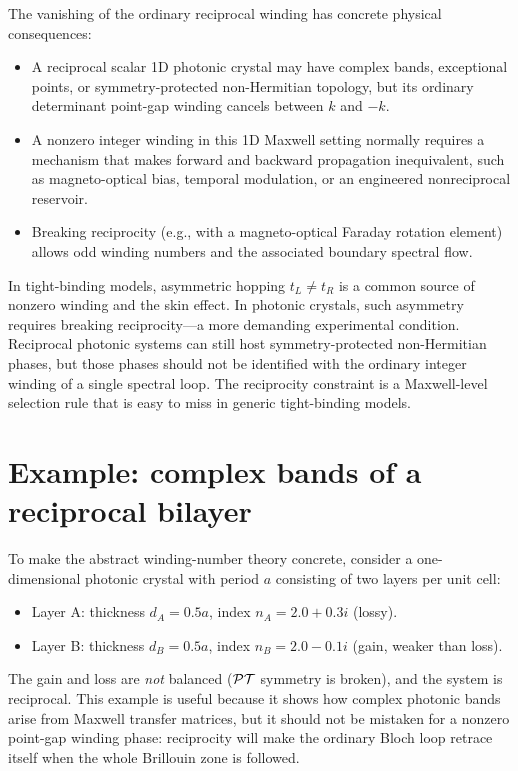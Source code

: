The vanishing of the ordinary reciprocal winding has concrete physical
consequences:
\begin{itemize}
 \item A reciprocal scalar 1D photonic crystal may have complex bands,
 exceptional points, or symmetry-protected non-Hermitian topology, but
 its ordinary determinant point-gap winding cancels between $k$ and
 $-k$.
 \item A nonzero integer winding in this 1D Maxwell setting normally
 requires a mechanism that makes forward and backward propagation
 inequivalent, such as magneto-optical bias, temporal modulation, or an
 engineered nonreciprocal reservoir.
 \item Breaking reciprocity (e.g., with a magneto-optical Faraday
 rotation element) allows odd winding numbers and the associated
 boundary spectral flow.
\end{itemize}

\begin{booknote}
In tight-binding models, asymmetric hopping $t_L \neq t_R$ is a common
source of nonzero winding and the skin effect. In photonic crystals,
such asymmetry requires breaking reciprocity---a more demanding
experimental condition. Reciprocal photonic systems can still host
symmetry-protected non-Hermitian phases, but those phases should not be
identified with the ordinary integer winding of a single spectral loop.
The reciprocity constraint is a Maxwell-level selection rule that is
easy to miss in generic tight-binding models.
\end{booknote}


\section{Example: complex bands of a reciprocal bilayer}
\label{sec:nh-bilayer}

To make the abstract winding-number theory concrete, consider a
one-dimensional photonic crystal with period $a$ consisting of two
layers per unit cell:
\begin{itemize}
 \item Layer A: thickness $d_A = 0.5a$, index $n_A = 2.0 + 0.3i$
 (lossy).
 \item Layer B: thickness $d_B = 0.5a$, index $n_B = 2.0 - 0.1i$
 (gain, weaker than loss).
\end{itemize}
The gain and loss are \emph{not} balanced ($\mathcal{PT}$ symmetry is broken),
and the system is reciprocal. This example is useful because it shows
how complex photonic bands arise from Maxwell transfer matrices, but it
should not be mistaken for a nonzero point-gap winding phase: reciprocity
will make the ordinary Bloch loop retrace itself when the whole
Brillouin zone is followed.

